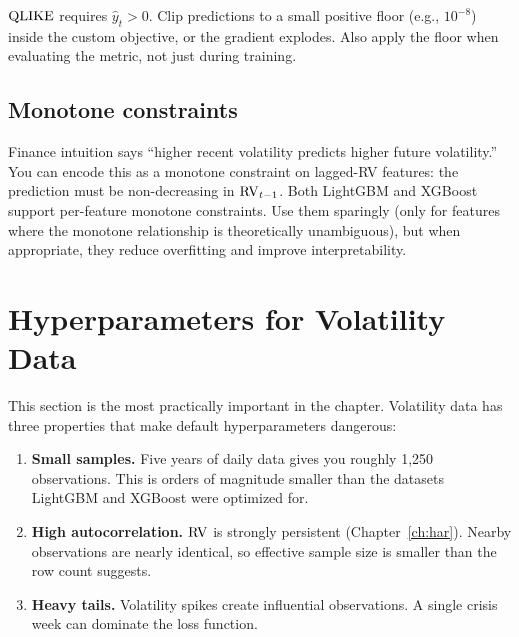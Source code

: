 \begin{warning}
$\operatorname{QLIKE}$ requires $\hat{y}_t > 0$.  Clip predictions to a small positive
floor (e.g., $10^{-8}$) inside the custom objective, or the gradient
explodes.  Also apply the floor when evaluating the metric, not just during
training.
\end{warning}

\subsection*{Monotone constraints}

Finance intuition says ``higher recent volatility predicts higher future
volatility.''  You can encode this as a monotone constraint on lagged-RV
features: the prediction must be non-decreasing in $\operatorname{RV}_{t-1}$.  Both
LightGBM and XGBoost support per-feature monotone constraints.  Use them
sparingly (only for features where the monotone relationship is
theoretically unambiguous), but when appropriate, they reduce overfitting
and improve interpretability.


\section{Hyperparameters for Volatility Data}\label{sec:trees:hyperparams}

This section is the most practically important in the chapter.  Volatility
data has three properties that make default hyperparameters dangerous:

\begin{enumerate}[leftmargin=1.8em]
\item \textbf{Small samples.}
  Five years of daily data gives you roughly 1,250 observations.  This is
  orders of magnitude smaller than the datasets LightGBM and XGBoost were
  optimized for.

\item \textbf{High autocorrelation.}
  $\operatorname{RV}$ is strongly persistent (Chapter~\ref{ch:har}).  Nearby observations
  are nearly identical, so effective sample size is smaller than the row
  count suggests.

\item \textbf{Heavy tails.}
  Volatility spikes create influential observations.  A single crisis week
  can dominate the loss function.
\end{enumerate}

